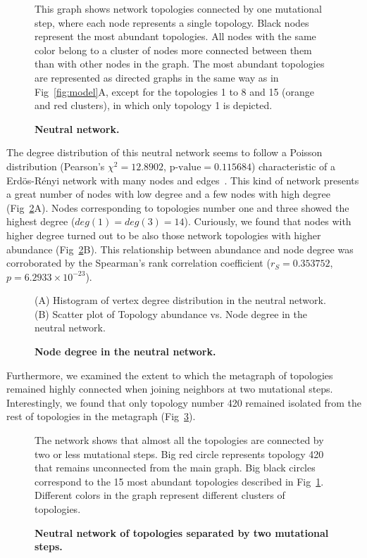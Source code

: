 \documentclass[10pt,letterpaper]{article}
\begin{document}
\begin{figure}[!h]
 \caption{\bf Neutral network.}
 This graph shows network topologies connected by one mutational step, where
 each node represents a single topology. Black nodes represent the most
 abundant topologies. All nodes with the same
 color belong to a cluster of nodes more connected between them than with other
 nodes in the graph. The most abundant topologies are represented as
 directed graphs in the same way as in Fig~\ref{fig:model}A, except for
 the topologies 1 to 8 and 15 (orange and red clusters), in which only
 topology 1 is depicted.
 \label{fig:neutral-network}
\end{figure}

The degree distribution of this neutral network seems to follow a Poisson distribution
(Pearson’s $\chi^2 = 12.8902$, $\text{p-value} = 0.115684$) characteristic of a
Erdös-Rényi network with many nodes and edges~\cite{Erdos1959}. This kind of
network presents a great
number of nodes with low degree and a few nodes with high degree
(Fig~\ref{fig:deg-dist}A). Nodes corresponding to topologies number one and
three showed the highest degree ($deg(1) = deg (3) = 14$). Curiously, we found
that nodes with higher degree turned out to be also those network topologies
with higher abundance
(Fig~\ref{fig:deg-dist}B). This relationship between abundance and node degree
was corroborated by the Spearman's rank correlation coefficient
($r_S = 0.353752$, $p = 6.2933\times10^{-23} $).

\begin{figure}[!h]
 \caption{\bf Node degree in the neutral network.}
 (A) Histogram of vertex degree distribution in the neutral network.
 (B) Scatter plot of Topology abundance vs. Node degree in the neutral
 network.
 \label{fig:deg-dist}
\end{figure}

Furthermore, we examined the extent to which the metagraph of topologies
remained highly connected when joining neighbors at two mutational steps.
Interestingly, we found that only topology number 420 remained isolated from
the rest of topologies in the metagraph (Fig~\ref{fig:2neut-net}).

\begin{figure}
 \caption{\bf Neutral network of topologies separated by two mutational
 steps.}
 The network shows that almost all the topologies are connected by two or less
 mutational steps. Big red circle represents topology 420 that remains
 unconnected from the main graph. Big black circles correspond to the 15
 most abundant topologies described in Fig~\ref{fig:neutral-network}.
 Different colors in the graph represent different clusters of topologies.
 \label{fig:2neut-net}
\end{figure}
\end{document}
